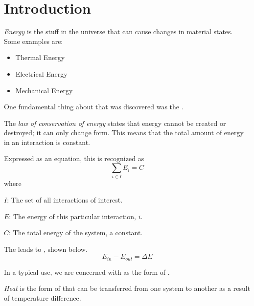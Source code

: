 \section{Introduction}\label{sec:Introduction}
\begin{definition}[Energy]\label{def:Energy}
  \emph{Energy} is the stuff in the universe that can cause changes in material states.
  Some examples are:
  \begin{itemize}[noitemsep]
  \item Thermal Energy
  \item Electrical Energy
  \item Mechanical Energy
  \end{itemize}
\end{definition}

One fundamental thing about  that was discovered was the .
\begin{definition}\label{def:Law_Conservation_Energy}
  The \emph{law of conservation of energy} states that energy cannot be created or destroyed; it can only change form.
  This means that the total amount of energy in an interaction is constant.

  Expressed as an equation, this is recognized as
  \begin{equation}\label{eq:Law_Conservation_Energy}
    \sum_{i \in I} E_{i} = C
  \end{equation}
  where
  \begin{description}[noitemsep]
  \item $I$: The set of all interactions of interest.
  \item $E$: The energy of this particular interaction, $i$.
  \item $C$: The total energy of the system, a constant.
  \end{description}
\end{definition}

The  leads to , shown below.
\begin{equation}\label{eq:Energy_Change}
  E_{in} - E_{out} = \Delta E
\end{equation}

In a typical use, we are concerned with  as the form of .
\begin{definition}[Heat]\label{def:Heat}
  \emph{Heat} is the form of  that can be transferred from one system to another as a result of temperature difference.
\end{definition}

